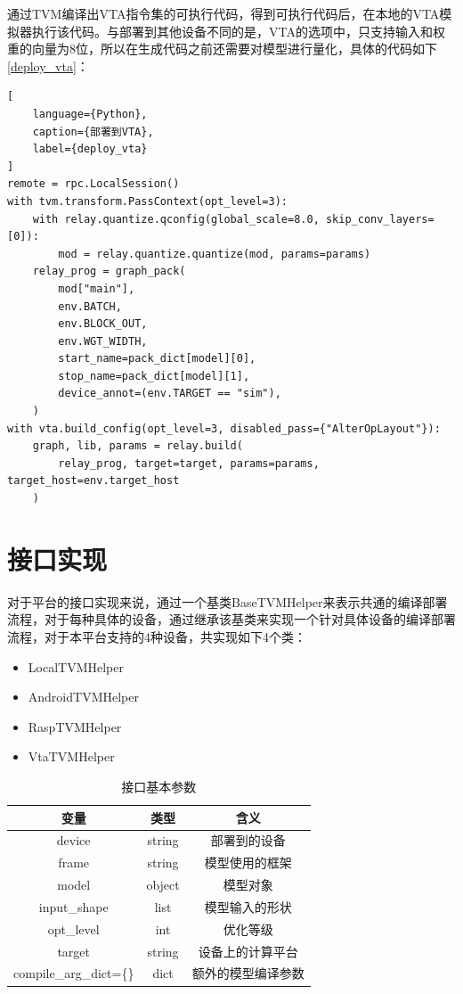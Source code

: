 通过TVM编译出VTA指令集的可执行代码，得到可执行代码后，在本地的VTA模拟器执行该代码。与部署到其他设备不同的是，VTA的选项中，只支持输入和权重的向量为8位，所以在生成代码之前还需要对模型进行量化，具体的代码如下\ref{deploy_vta}：

\begin{lstlisting}[
    language={Python},
    caption={部署到VTA},
    label={deploy_vta}
]
remote = rpc.LocalSession()
with tvm.transform.PassContext(opt_level=3):
    with relay.quantize.qconfig(global_scale=8.0, skip_conv_layers=[0]):
        mod = relay.quantize.quantize(mod, params=params)
    relay_prog = graph_pack(
        mod["main"],
        env.BATCH,
        env.BLOCK_OUT,
        env.WGT_WIDTH,
        start_name=pack_dict[model][0],
        stop_name=pack_dict[model][1],
        device_annot=(env.TARGET == "sim"),
    )
with vta.build_config(opt_level=3, disabled_pass={"AlterOpLayout"}):
    graph, lib, params = relay.build(
        relay_prog, target=target, params=params, target_host=env.target_host
    )
\end{lstlisting}


\section{接口实现}

对于平台的接口实现来说，通过一个基类BaseTVMHelper来表示共通的编译部署流程，对于每种具体的设备，通过继承该基类来实现一个针对具体设备的编译部署流程，对于本平台支持的4种设备，共实现如下4个类：
\begin{itemize}
    \item {LocalTVMHelper}
    \item {AndroidTVMHelper}
    \item {RaspTVMHelper}
    \item {VtaTVMHelper}
\end{itemize}

\begin{table}
    \centering
    \caption{接口基本参数}
    \label{interface_base_params}
    \begin{tabular}{c|c|c}
        \hline
        变量                      & 类型     & 含义        \\ \hline
        device                  & string & 部署到的设备    \\ \hline
        frame                   & string & 模型使用的框架   \\ \hline
        model                   & object & 模型对象      \\ \hline
        input\_shape            & list   & 模型输入的形状   \\ \hline
        opt\_level              & int    & 优化等级      \\ \hline
        target                  & string & 设备上的计算平台  \\ \hline
        compile\_arg\_dict=\{\} & dict   & 额外的模型编译参数 \\ \hline
    \end{tabular}
\end{table}

